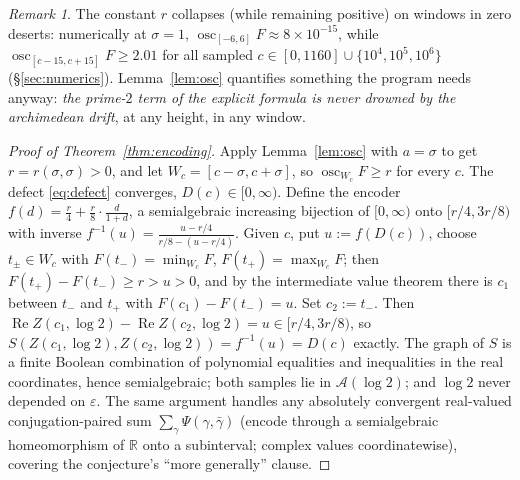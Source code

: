 \documentclass[11pt]{amsart}
\theoremstyle{plain}
\theoremstyle{definition}
\theoremstyle{remark}
\newtheorem{remark}[theorem]{Remark}
\newcommand{\RR}{\mathbb{R}}
\newcommand{\re}{\operatorname{Re}}
\DeclareMathOperator{\osc}{osc}
\begin{document}
\begin{remark}\label{rem:deserts}
The constant $r$ collapses (while remaining positive) on windows in zero deserts: numerically at
$\sigma=1$, $\osc_{[-6,6]}F\approx8\times10^{-15}$, while $\osc_{[c-15,c+15]}F\ge2.01$ for all
sampled $c\in[0,1160]\cup\{10^4,10^5,10^6\}$ (\S\ref{sec:numerics}). Lemma~\ref{lem:osc}
quantifies something the program needs anyway: \emph{the prime-$2$ term of the explicit formula is
never drowned by the archimedean drift}, at any height, in any window.
\end{remark}

\begin{proof}[Proof of Theorem~\ref{thm:encoding}]
Apply Lemma~\ref{lem:osc} with $a=\sigma$ to get $r=r(\sigma,\sigma)>0$, and let
$W_c=[c-\sigma,c+\sigma]$, so $\osc_{W_c}F\ge r$ for every $c$. The defect \eqref{eq:defect}
converges, $D(c)\in[0,\infty)$. Define the encoder
$f(d)=\frac r4+\frac r8\cdot\frac d{1+d}$, a semialgebraic increasing bijection of $[0,\infty)$
onto $[r/4,3r/8)$ with inverse $f^{-1}(u)=\frac{u-r/4}{r/8-(u-r/4)}$. Given $c$, put
$u:=f(D(c))$, choose $t_\pm\in W_c$ with $F(t_-)=\min_{W_c}F$, $F(t_+)=\max_{W_c}F$; then
$F(t_+)-F(t_-)\ge r>u>0$, and by the intermediate value theorem there is $c_1$ between $t_-$ and
$t_+$ with $F(c_1)-F(t_-)=u$. Set $c_2:=t_-$. Then
$\re Z(c_1,\log2)-\re Z(c_2,\log2)=u\in[r/4,3r/8)$, so
$S(Z(c_1,\log2),Z(c_2,\log2))=f^{-1}(u)=D(c)$ exactly. The graph of $S$ is a finite Boolean
combination of polynomial equalities and inequalities in the real coordinates, hence
semialgebraic; both samples lie in $\mathcal A(\log2)$; and $\log2$ never depended on
$\varepsilon$. The same argument handles any absolutely convergent real-valued conjugation-paired
sum $\sum_\gamma\Psi(\gamma,\bar\gamma)$ (encode through a semialgebraic homeomorphism of $\RR$
onto a subinterval; complex values coordinatewise), covering the conjecture's ``more generally''
clause.
\end{proof}
\end{document}
